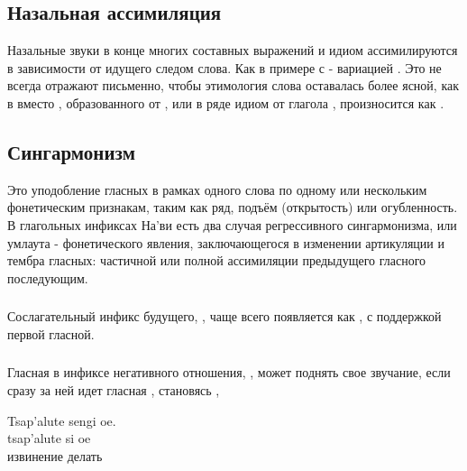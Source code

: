 \subsection{Назальная ассимиляция} Назальные звуки в конце многих составных выражений и идиом ассимилируются в зависимости от идущего следом слова. Как в примере с  - вариацией .  Это не всегда отражают письменно, чтобы этимология слова оставалась более ясной, как в  вместо , образованного от , или в ряде идиом от глагола  ,  произносится как
.  \label{l-and-s:nasalassim}

\subsection{Сингармонизм} Это уподобление гласных в рамках одного слова по одному или нескольким фонетическим признакам, таким как ряд, подъём (открытость) или огуб\-лен\-ность.
В глагольных инфиксах На'ви есть два случая регрессивного сингармонизма, или умлаута - фонетического явления, заключающегося в изменении артикуляции и тембра гласных: частичной или полной ассимиляции предыдущего гласного последующим.

\subsubsection{} Сослагательный инфикс будущего, , чаще всего появляется как , с поддержкой первой гласной.

\subsubsection{}\label{l-and-s:eng}
Гласная в инфиксе негативного отношения, , может поднять свое звучание, если сразу за ней идет гласная , становясь ,

\begin{interlin}
\glll Tsap'alute sengi oe. \\
      tsap'alute si oe \\
      извинение делать  \\
\end{interlin}


